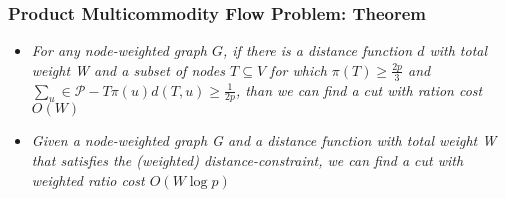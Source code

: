 \begin{frame}
\frametitle{Product Multicommodity Flow Problem: Theorem}

\begin{itemize}
\item \emph{For any node-weighted graph $G$, if there is a distance function $d$ with total weight W and a subset of nodes $T \subseteq V$ for which $\pi (T) \geq \frac{2p}{3}$ and $\sum_{u} \in \mathscr{P}-T \pi (u)d(T,u) \geq \frac{1}{2p}$, than we can find a cut with ration cost $O(W)$}
\item \emph{Given a node-weighted graph G and a distance function with total weight W that satisfies the (weighted) distance-constraint, we can find a cut with weighted ratio cost $O(W \log p)$}
\end{itemize}

\end{frame}